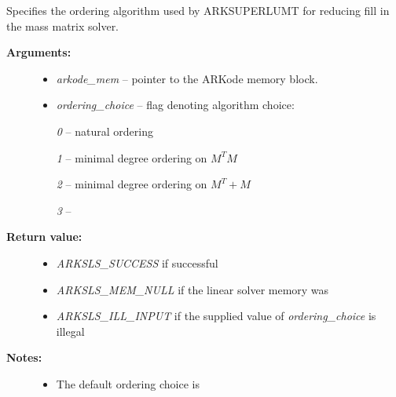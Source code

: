 \documentclass[letterpaper,10pt,english]{sphinxmanual}
\begin{document}
\begin{fulllineitems}
\label{c_interface/User_callable:c.ARKMassSuperLUMTSetOrdering}
Specifies the ordering algorithm used by ARKSUPERLUMT for reducing
fill in the mass matrix solver.
\begin{description}
\item[{\textbf{Arguments:}}] \leavevmode\begin{itemize}
\item {} 
\emph{arkode\_mem} -- pointer to the ARKode memory block.

\item {} 
\emph{ordering\_choice} -- flag denoting algorithm choice:

\emph{0} -- natural ordering

\emph{1} -- minimal degree ordering on \(M^TM\)

\emph{2} -- minimal degree ordering on \(M^T + M\)

\emph{3} -- 

\end{itemize}

\item[{\textbf{Return value:}}] \leavevmode\begin{itemize}
\item {} 
\emph{ARKSLS\_SUCCESS}  if successful

\item {} 
\emph{ARKSLS\_MEM\_NULL} if the linear solver memory was 

\item {} 
\emph{ARKSLS\_ILL\_INPUT} if the supplied value of \emph{ordering\_choice} is illegal

\end{itemize}

\item[{\textbf{Notes:}}] \leavevmode\begin{itemize}
\item {} 
The default ordering choice is 

\end{itemize}

\end{description}

\end{fulllineitems}
\end{document}
